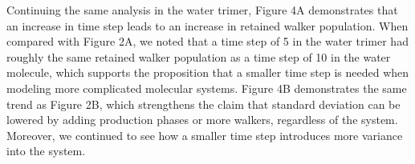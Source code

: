 \documentclass[journal=jacsat,manuscript=article]{achemso}
\newcommand*{\figuretitle}[1]{%
    {\centering%
    \textbf{#1}%
    \par\medskip}%
}
\begin{document}

Continuing the same analysis in the water trimer, Figure 4A demonstrates that an increase in time step leads to an increase in retained walker population. When compared with Figure 2A, we noted that a time step of 5 in the water trimer had roughly the same retained walker population as a time step of 10 in the water molecule, which supports the proposition that a smaller time step is needed when modeling more complicated molecular systems. Figure 4B demonstrates the same trend as Figure 2B, which strengthens the claim that standard deviation can be lowered by adding production phases or more walkers, regardless of the system. Moreover, we continued to see how a smaller time step introduces more variance into the system. 

\end{document}
